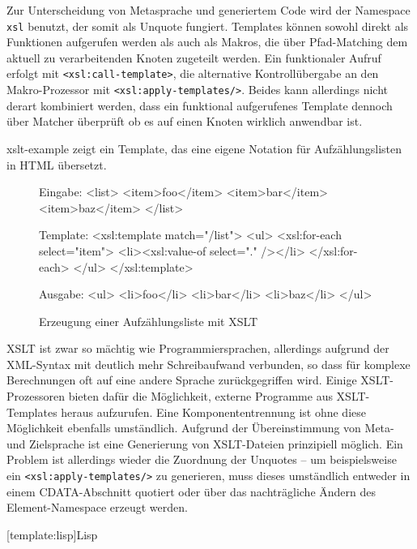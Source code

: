 \documentclass[12pt, a4paper, bibgerm]{scrbook}
\newenvironment{DIFnomarkup}{}{}
\newcommand\icode[1]{\lstinline?#1?}
\newcommand\lsection{}
\newcommand\abb{}
\begin{document}
Zur Unterscheidung von Metasprache und generiertem Code wird der
Namespace \icode{xsl} benutzt, der somit als Unquote fungiert. Templates
können sowohl direkt als Funktionen aufgerufen werden als auch als Makros,
die über Pfad-Matching dem aktuell zu verarbeitenden Knoten zugeteilt
werden. Ein funktionaler Aufruf erfolgt mit \icode{<xsl:call-template>},
die alternative Kontrollübergabe an den Makro-Prozessor mit
\icode{<xsl:apply-templates/>}. Beides kann allerdings nicht derart
kombiniert werden, dass ein funktional aufgerufenes Template dennoch
über Matcher überprüft ob es auf einen Knoten wirklich anwendbar ist.

\abb{xslt-example} zeigt ein Template, das eine eigene Notation für
Aufzählungslisten in HTML übersetzt.
\begin{figure}
  \centering
  \begin{DIFnomarkup}\begin{code}
Eingabe:
<list>
  <item>foo</item>
  <item>bar</item>
  <item>baz</item>
</list>

Template:
<xsl:template match="/list">
  <ul>
    <xsl:for-each select="item">
      <li><xsl:value-of select="." /></li>
    </xsl:for-each>
  </ul>
</xsl:template>    

Ausgabe:
<ul>
  <li>foo</li>
  <li>bar</li>
  <li>baz</li>
</ul>
  \end{code}\end{DIFnomarkup} %
  \caption{Erzeugung einer Aufzählungsliste mit XSLT}
  \label{magicl:fig:xslt-example}
\end{figure}

XSLT ist zwar so mächtig wie Programmiersprachen,
allerdings aufgrund der XML-Syntax mit deutlich mehr Schreibaufwand
verbunden, so dass für komplexe Berechnungen oft auf eine andere Sprache
zurückgegriffen wird. Einige XSLT-Prozessoren bieten dafür die
Möglichkeit, externe Programme aus XSLT-Templates heraus
aufzurufen. Eine Komponententrennung ist ohne diese Möglichkeit
ebenfalls umständlich. Aufgrund der Übereinstimmung von Meta- und
Zielsprache ist eine Generierung von XSLT-Dateien prinzipiell
möglich. Ein Problem ist allerdings wieder die Zuordnung der Unquotes --
um beispielsweise ein \icode{<xsl:apply-templates/>} zu generieren, muss
dieses umständlich entweder in einem CDATA-Abschnitt quotiert oder über
das nachträgliche Ändern des Element-Namespace erzeugt werden.

\lsection[template:lisp]{Lisp}
\end{document}
